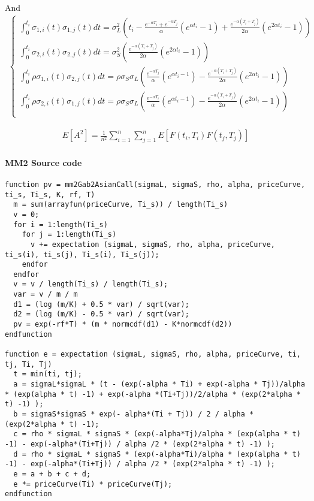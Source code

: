 \documentclass[12pt,a4paper,hidelinks,fleqn]{article}            %
\begin{document}
And
\begin{align*}
\begin{cases}
\int_0^{t_i} \sigma_{1,i} (t) \sigma_{1, j} (t) dt = \sigma_L^2\left( 
t_i - \frac{e^{-\alpha T_i} + e^{-\alpha T_j}}{\alpha} (e^{\alpha t_i} - 1) + \frac{e^{-\alpha(T_i + T_j)}}{2\alpha} (e^{2\alpha t_i} - 1)
\right)\\
\int_0^{t_i} \sigma_{2,i} (t) \sigma_{2, j} (t) dt = \sigma_S^2 \left(\frac{e^{-\alpha(T_i + T_j)}}{2\alpha} (e^{2\alpha t_i} - 1)\right) \\
\int_0^{t_i} \rho \sigma_{1,i} (t) \sigma_{2, j} (t) dt = \rho \sigma_S \sigma_L \left( \frac{e^{-\alpha T_j}}{\alpha} (e^{\alpha t_i - 1}) - \frac{e^{ - \alpha(T_i + T_j)}}{2\alpha}(e^{2\alpha t_i} - 1)\right) \\
\int_0^{t_i} \rho \sigma_{2,i} (t) \sigma_{1, j} (t) dt = \rho \sigma_S \sigma_L \left( \frac{e^{-\alpha T_i}}{\alpha} (e^{\alpha t_i - 1}) - \frac{e^{ - \alpha(T_i + T_j)}}{2\alpha}(e^{2\alpha t_i} - 1)\right)\\
\end{cases}
\end{align*}

\begin{align*}
E[A^2] = \frac{1}{n^2}\sum_{i=1}^n \sum_{j=1}^n E[F(t_i, T_i) F(t_j, T_j)] 
\end{align*}

\paragraph{MM2 Source code}
\begin{verbatim}
function pv = mm2Gab2AsianCall(sigmaL, sigmaS, rho, alpha, priceCurve, ti_s, Ti_s, K, rf, T)
  m = sum(arrayfun(priceCurve, Ti_s)) / length(Ti_s)
  v = 0;
  for i = 1:length(Ti_s)
    for j = 1:length(Ti_s)
      v += expectation (sigmaL, sigmaS, rho, alpha, priceCurve, ti_s(i), ti_s(j), Ti_s(i), Ti_s(j));
    endfor
  endfor
  v = v / length(Ti_s) / length(Ti_s);
  var = v / m / m
  d1 = (log (m/K) + 0.5 * var) / sqrt(var);
  d2 = (log (m/K) - 0.5 * var) / sqrt(var);
  pv = exp(-rf*T) * (m * normcdf(d1) - K*normcdf(d2))
endfunction

function e = expectation (sigmaL, sigmaS, rho, alpha, priceCurve, ti, tj, Ti, Tj)
  t = min(ti, tj);
  a = sigmaL*sigmaL * (t - (exp(-alpha * Ti) + exp(-alpha * Tj))/alpha * (exp(alpha * t) -1) + exp(-alpha *(Ti+Tj))/2/alpha * (exp(2*alpha * t) -1) );
  b = sigmaS*sigmaS * exp(- alpha*(Ti + Tj)) / 2 / alpha * (exp(2*alpha * t) -1);
  c = rho * sigmaL * sigmaS * (exp(-alpha*Tj)/alpha * (exp(alpha * t) -1) - exp(-alpha*(Ti+Tj)) / alpha /2 * (exp(2*alpha * t) -1) );
  d = rho * sigmaL * sigmaS * (exp(-alpha*Ti)/alpha * (exp(alpha * t) -1) - exp(-alpha*(Ti+Tj)) / alpha /2 * (exp(2*alpha * t) -1) );
  e = a + b + c + d;
  e *= priceCurve(Ti) * priceCurve(Tj);
endfunction 
\end{verbatim}
\end{document}
